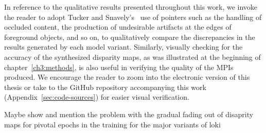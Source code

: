 In reference to the qualitative results presented throughout this work, we invoke the reader to adopt Tucker and Snavely's~\cite{single_view_mpi} use of pointers such as the handling of occluded content, the production of undesirable artifacts at the edges of foreground objects, and so on, to qualitatively compare the discrepancies in the results generated by each model variant. Similarly, visually checking for the accuracy of the synthesized disparity maps, as was illustrated at the beginning of chapter~\ref{ch3:methods}, is also useful in verifying the quality of the MPIs produced. We encourage the reader to zoom into the electronic version of this thesis or take to the GitHub repository accompanying this work (Appendix~\ref{sec:code-sources}) for easier visual verification.




Maybe show and mention the problem with the gradual fading out of disaprity maps for pivotal epochs in the training for the major variants of loki

